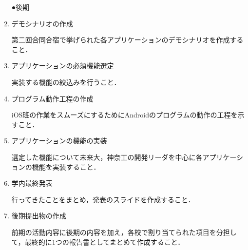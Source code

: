 \begin{enumerate}
\par ●後期
\item デモシナリオの作成
\par 第二回合同合宿で挙げられた各アプリケーションのデモシナリオを作成すること．
\item アプリケーションの必須機能選定
\par 実装する機能の絞込みを行うこと．
\item プログラム動作工程の作成
\par iOS班の作業をスムーズにするためにAndroidのプログラムの動作の工程を示すこと．
\item アプリケーションの機能の実装
\par 選定した機能について未来大，神奈工の開発リーダを中心に各アプリケーションの機能を実装すること．
\item 学内最終発表
\par 行ってきたことをまとめ，発表のスライドを作成すること．
\item 後期提出物の作成 
\par 前期の活動内容に後期の内容を加え，各校で割り当てられた項目を分担して，最終的に1つの報告書としてまとめて作成すること． 

\end{enumerate}

